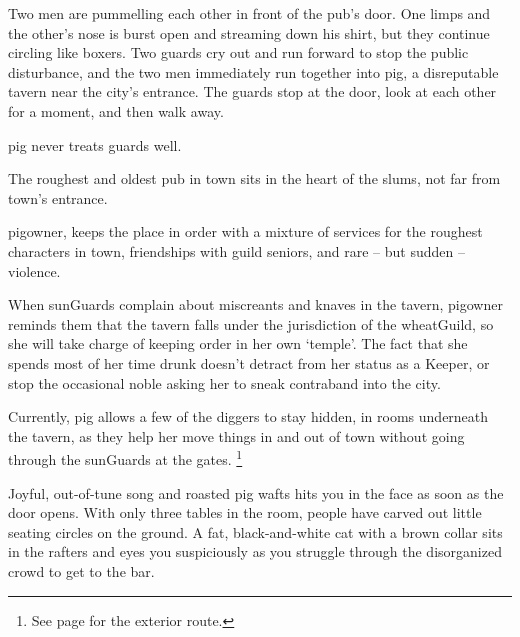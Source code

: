 
\begin{boxtext}
  Two men are pummelling each other in front of the pub's door.
   One limps and the other's nose is burst open and streaming down his shirt, but they continue circling like boxers.
   Two guards cry out and run forward to stop the public disturbance, and the two men immediately run together into \gls{pig}, a disreputable tavern near the city's entrance.
   The guards stop at the door, look at each other for a moment, and then walk away.

\Gls{pig} never treats \glspl{guard} well.
\end{boxtext}
 
The roughest and oldest pub in \gls{town} sits in the heart of the slums, not far from \gls{town}'s entrance.

\Gls{pigowner}, keeps the place in order with a mixture of services for the roughest characters in \gls{town}, friendships with guild seniors, and rare -- but sudden -- violence.

When \glspl{sunGuard} complain about miscreants and knaves in the tavern, \gls{pigowner} reminds them that the tavern falls under the jurisdiction of the \gls{wheatGuild}, so she will take charge of keeping order in her own `temple'.
The fact that she spends most of her time drunk doesn't detract from her status as a Keeper, or stop the occasional noble asking her to sneak contraband into the city.

Currently, \gls{pig} allows a few of the \glspl{digger} to stay hidden, in rooms underneath the tavern, as they help her move things in and out of town without going through the \glspl{sunGuard} at the gates.%
\footnote{See page \pageref{farmExit} for the exterior route.}


\begin{boxtext}
  Joyful, out-of-tune song and roasted pig wafts hits you in the face as soon as the door opens.
  With only three tables in the room, people have carved out little seating circles on the ground.
  A fat, black-and-white cat with a brown collar sits in the rafters and eyes you suspiciously as you struggle through the disorganized crowd to get to the bar.
\end{boxtext}

